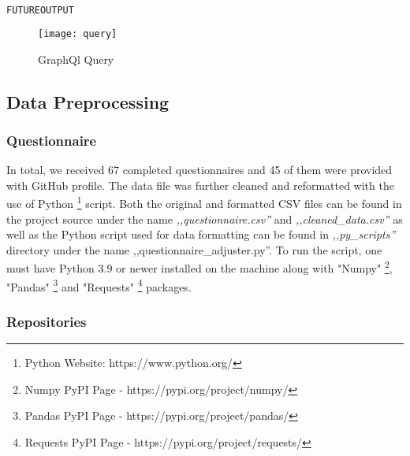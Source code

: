 \documentclass[graybox]{svmult}
\begin{document}
\begin{lstlisting}[language=Python, label={lst:graphql-output-json}]
FUTUREOUTPUT
\end{lstlisting} 

\begin{figure}[htp]
\centering
\texttt{[image: query]}
\caption{GraphQl Query}
\label{fig:GraphQlQuery}
\end{figure}

\subsection{Data Preprocessing}

\subsubsection{Questionnaire}

In total, we received 67 completed questionnaires and 45 of them were provided with GitHub profile. The data file was further cleaned and reformatted with the use of Python \footnote{Python Website: https://www.python.org/} script. Both the original and formatted CSV files can be found in the project source under the name \emph{,,questionnaire.csv''} and \emph{,,cleaned\_data.csv''} as well as the Python script used for data formatting can be found in \emph{,,py\_scripts''} directory under the name ,,questionnaire\_adjuster.py''. To run the script, one must have Python 3.9 or newer installed on the machine along with "Numpy" \footnote{Numpy PyPI Page - https://pypi.org/project/numpy/}, "Pandas" \footnote{Pandas PyPI Page - https://pypi.org/project/pandas/} and "Requests" \footnote{Requests PyPI Page - https://pypi.org/project/requests/} packages.

\subsubsection{Repositories}
\end{document}
